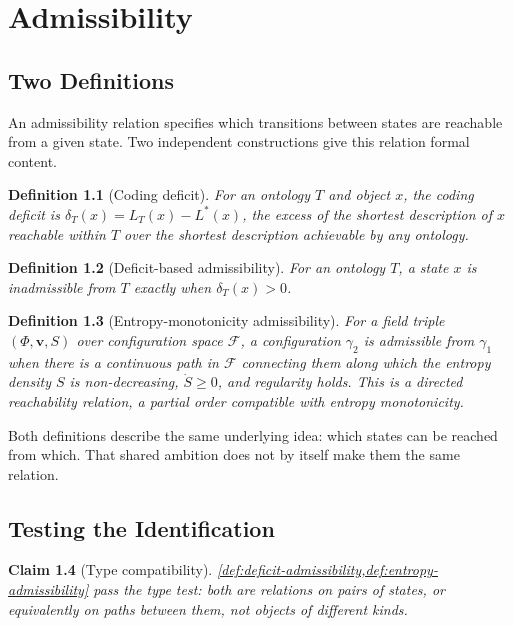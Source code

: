 \documentclass[12pt]{report}
\newtheorem{definition}{Definition}[section]
\newtheorem{claim}[definition]{Claim}
\begin{document}
\chapter{Admissibility}

\section{Two Definitions}
\label{sec:two-definitions}

An admissibility relation specifies which transitions between states
are reachable from a given state. Two independent constructions give
this relation formal content.

\begin{definition}[Coding deficit]
\label{def:coding-deficit-recall-adm}
For an ontology $T$ and object $x$, the coding deficit is
$\delta_T(x) = L_T(x) - L^*(x)$, the excess of the shortest description
of $x$ reachable within $T$ over the shortest description achievable by
any ontology.
\end{definition}

\begin{definition}[Deficit-based admissibility]
\label{def:deficit-admissibility}
For an ontology $T$, a state $x$ is inadmissible from $T$ exactly when
$\delta_T(x) > 0$.
\end{definition}

\begin{definition}[Entropy-monotonicity admissibility]
\label{def:entropy-admissibility}
For a field triple $(\Phi, \mathbf{v}, S)$ over configuration space
$\mathcal{F}$, a configuration $\gamma_2$ is admissible from $\gamma_1$
when there is a continuous path in $\mathcal{F}$ connecting them along
which the entropy density $S$ is non-decreasing, $\dot{S} \geq 0$, and
regularity holds. This is a directed reachability relation, a partial
order compatible with entropy monotonicity.
\end{definition}

Both definitions describe the same underlying idea: which states can be
reached from which. That shared ambition does not by itself make them
the same relation.

\section{Testing the Identification}
\label{sec:testing}

\begin{claim}[Type compatibility]
\label{claim:type-test}
\cref{def:deficit-admissibility,def:entropy-admissibility} pass the type
test: both are relations on pairs of states, or equivalently on paths
between them, not objects of different kinds.
\end{claim}
\end{document}

